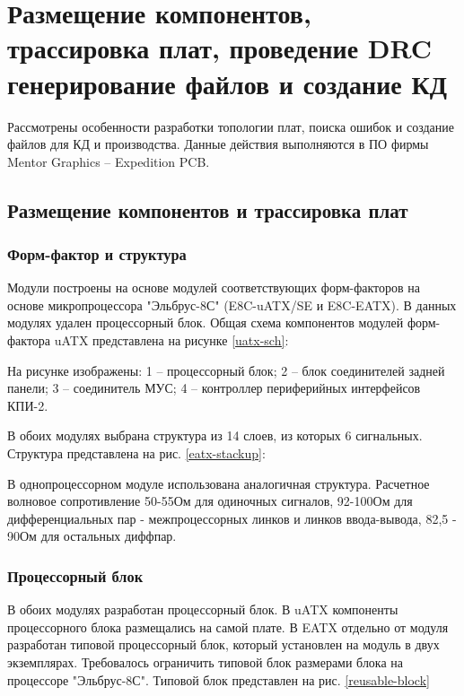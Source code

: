 \section{Размещение компонентов, трассировка плат, проведение DRC генерирование файлов и создание КД}

Рассмотрены особенности разработки топологии плат, поиска ошибок и создание файлов для КД и производства. Данные действия выполняются в ПО фирмы Mentor Graphics -- Expedition PCB.

\subsection{Размещение компонентов и трассировка плат}

\subsubsection{Форм-фактор и структура}
Модули построены на основе модулей соответствующих форм-факторов на основе микропроцессора "Эльбрус-8С" (E8C-uATX/SE и E8C-EATX). В данных модулях удален процессорный блок. Общая схема компонентов модулей форм-фактора uATX представлена на рисунке \ref{uatx-sch}:

На рисунке изображены: 1 -- процессорный блок; 2 -- блок соединителей задней панели; 3 -- соединитель МУС; 4 -- контроллер периферийных интерфейсов КПИ-2.

В обоих модулях выбрана структура из 14 слоев, из которых 6 сигнальных. Структура представлена на рис. \ref{eatx-stackup}:

В однопроцессорном модуле использована аналогичная структура. Расчетное волновое сопротивление 50-55Ом для одиночных сигналов, 92-100Ом для дифференциальных пар - межпроцессорных линков и линков ввода-вывода, 82,5 - 90Ом для остальных диффпар.

\subsubsection{Процессорный блок}

В обоих модулях разработан процессорный блок. В uATX компоненты процессорного блока размещались на самой плате. В EATX отдельно от модуля разработан типовой процессорный блок, который установлен на модуль в двух экземплярах. Требовалось ограничить типовой блок размерами блока на процессоре "Эльбрус-8С". Типовой блок представлен на рис. \ref{reusable-block}

